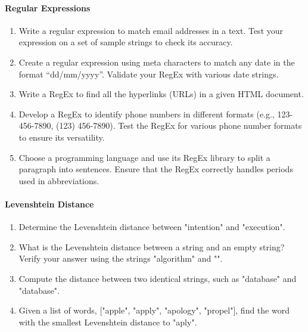 \paragraph*{Regular Expressions}
\begin{enumerate}
    \item Write a regular expression to match email addresses in a text. Test your expression on a set of sample strings to check its accuracy.
    \item Create a regular expression using meta characters to match any date in the format ``dd/mm/yyyy''. Validate your RegEx with various date strings.
    \item Write a RegEx to find all the hyperlinks (URLs) in a given HTML document.
    \item Develop a RegEx to identify phone numbers in different formats (e.g., 123-456-7890, (123) 456-7890). Test the RegEx for various phone number formats to ensure its versatility.
    \item Choose a programming language and use its RegEx library to split a paragraph into sentences. Ensure that the RegEx correctly handles periods used in abbreviations.
\end{enumerate}
\paragraph*{Levenshtein Distance}
\begin{enumerate}
    \item Determine the Levenshtein distance between "intention" and "execution".
    \item What is the Levenshtein distance between a string and an empty string? Verify your answer using the strings "algorithm" and "".
    \item Compute the distance between two identical strings, such as "database" and "database".
    \item Given a list of words, ["apple", "apply", "apology", "propel"], find the word with the smallest Levenshtein distance to "aply".
\end{enumerate}
